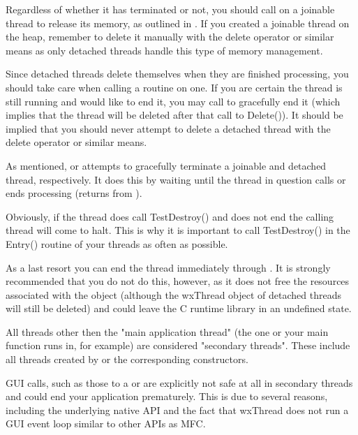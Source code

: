 \label{deletionwxthread}

Regardless of whether it has terminated or not, you should call 
 on a joinable thread to release its
memory, as outlined in . If you created
a joinable thread on the heap, remember to delete it manually with the delete 
operator or similar means as only detached threads handle this type of memory 
management.

Since detached threads delete themselves when they are finished processing,
you should take care when calling a routine on one. If you are certain the 
thread is still running and would like to end it, you may call 
 to gracefully end it (which implies
that the thread will be deleted after that call to Delete()). It should be
implied that you should never attempt to delete a detached thread with the 
delete operator or similar means. 

As mentioned,  or 
 attempts to gracefully terminate
a joinable and detached thread, respectively. It does this by waiting until
the thread in question calls 
or ends processing (returns from ).

Obviously, if the thread does call TestDestroy() and does not end the calling
thread will come to halt. This is why it is important to call TestDestroy() in
the Entry() routine of your threads as often as possible.

As a last resort you can end the thread immediately through 
. It is strongly recommended that you
do not do this, however, as it does not free the resources associated with
the object (although the wxThread object of detached threads will still be
deleted) and could leave the C runtime library in an undefined state.

\label{secondarywxthread}

All threads other then the "main application thread" (the one
 or your main function runs in, for 
example) are considered "secondary threads". These include all threads created 
by  or the corresponding constructors.

GUI calls, such as those to a  or 
 are explicitly not safe at all in secondary threads 
and could end your application prematurely. This is due to several reasons,
including the underlying native API and the fact that wxThread does not run a 
GUI event loop similar to other APIs as MFC. 

